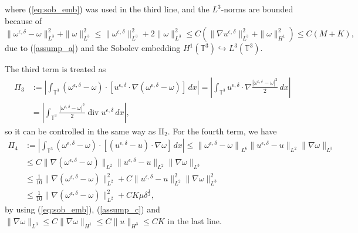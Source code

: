 \documentclass[reqno,10pt]{amsart}
\theoremstyle{definition}
\theoremstyle{remark}
\numberwithin{equation}{section}
\DeclareMathOperator{\dive}{div}
\begin{document}
where (\ref{eq:sob_emb}) was used in the third line, and the $L^3$-norms are bounded because of 
\[
    \|\omega^{\epsilon,\delta}-\omega\|_{L^3}^2 + \|\omega\|_{L^3}^2 \le \|\omega^{\epsilon,\delta}\|_{L^3}^2 + 2\|\omega\|_{L^3}^2 \le C\left( \|\nabla u^{\epsilon,\delta}\|_{L^3}^2 + \|\omega\|_{H^1}^2 \right) \le C(M+K),
\]
due to (\ref{assump_a}) and the Sobolev embedding $H^1(\mathbb T^3) \hookrightarrow L^3(\mathbb T^3)$. 

The third term is treated as
\[
\begin{aligned}
   \Pi_3 &:= \left| \int_{\mathbb T^3} (\omega^{\epsilon,\delta}-\omega)\cdot \left[ u^{\epsilon,\delta} \cdot \nabla (\omega^{\epsilon,\delta} - \omega) \right] \,dx \right|
    = \left| \int_{\mathbb T^3} u^{\epsilon,\delta}\cdot \nabla \frac{|\omega^{\epsilon,\delta}-\omega|^2}{2} \,dx \right| \\
    &= \left| \int_{\mathbb T^3} \frac{|\omega^{\epsilon,\delta}-\omega|^2}{2} \dive u^{\epsilon,\delta} \,dx\right|,
\end{aligned}
\]
so it can be controlled in the same way as $\text{II}_2$. For the fourth term, we have
\[
\begin{aligned}
   \Pi_4 &:= \left| \int_{\mathbb T^3} (\omega^{\epsilon,\delta}-\omega)\cdot \left[ (u^{\epsilon,\delta}-u)\cdot\nabla \omega \right] \,dx \right|
    \le {\|\omega^{\epsilon,\delta} -\omega\|}_{L^6} \|u^{\epsilon,\delta}-u\|_{L^2} \|\nabla \omega\|_{L^3} \\
    &\le C \|\nabla(\omega^{\epsilon,\delta}-\omega)\|_{L^2} \|u^{\epsilon,\delta}-u\|_{L^2} \|\nabla \omega\|_{L^3} \\
    &\le \frac{1}{10} \|\nabla(\omega^{\epsilon,\delta}-\omega)\|_{L^2}^2 + C \|u^{\epsilon,\delta}-u\|_{L^2}^2 \|\nabla \omega\|_{L^3}^2  \\
    &\le \frac{1}{10} \|\nabla(\omega^{\epsilon,\delta}-\omega)\|_{L^2}^2 + CK\mu\delta^{\frac{1}{2}},
\end{aligned}
\]
by using (\ref{eq:sob_emb}), (\ref{assump_c}) and $\|\nabla \omega\|_{L^3}\le C\|\nabla \omega\|_{H^1}\le C\|u\|_{H^3}\le CK$ in the last line.
\end{document}
